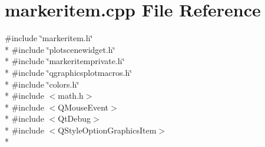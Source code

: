 \section{markeritem.\+cpp File Reference}
\label{bk3_2items_2markeritem_8cpp}
{\ttfamily \#include \char`\"{}markeritem.\+h\char`\"{}}\\*
{\ttfamily \#include \char`\"{}plotscenewidget.\+h\char`\"{}}\\*
{\ttfamily \#include \char`\"{}markeritemprivate.\+h\char`\"{}}\\*
{\ttfamily \#include \char`\"{}qgraphicsplotmacros.\+h\char`\"{}}\\*
{\ttfamily \#include \char`\"{}colors.\+h\char`\"{}}\\*
{\ttfamily \#include $<$math.\+h$>$}\\*
{\ttfamily \#include $<$Q\+Mouse\+Event$>$}\\*
{\ttfamily \#include $<$Qt\+Debug$>$}\\*
{\ttfamily \#include $<$Q\+Style\+Option\+Graphics\+Item$>$}\\*
